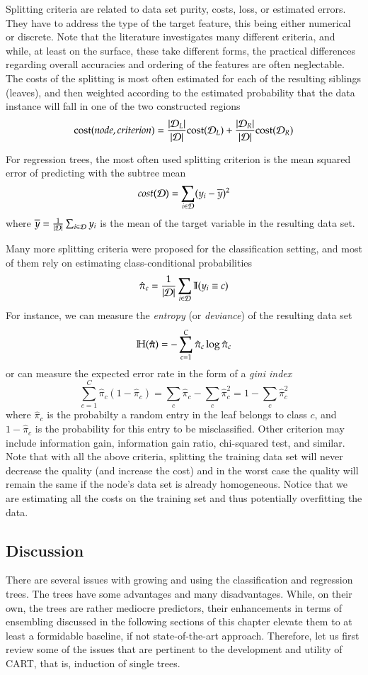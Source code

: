 \begin{refsection}
Splitting criteria are related to data set purity, costs, loss, or estimated errors. They have to address the type of the target feature, this being either numerical or discrete. Note that the literature investigates many different criteria, and while, at least on the surface, these take different forms, the practical differences regarding overall accuracies and ordering of the features are often neglectable. The costs of the splitting is most often estimated for each of the resulting siblings (leaves), and then weighted according to the estimated probability that the data instance will fall in one of the two constructed regions
$$ {\rm cost}(node, criterion) = {|\mathcal{D}_L|\over |\mathcal{D}|}{\rm cost}(\mathcal{D}_L) + {|\mathcal{D}_R|\over |\mathcal{D}|}{\rm cost}(\mathcal{D}_R) $$

For regression trees, the most often used splitting criterion is the mean squared error of predicting with the subtree mean
$$ cost(\mathcal{D}) = \sum_{i\in\mathcal{D}}(y_i-\overline{y})^2 $$
where $\overline{y} = {1\over|\mathcal{D}|}\sum_{i\in\mathcal{D}}y_i$ is the mean of the target variable in the resulting data set.

Many more splitting criteria were proposed for the classification setting, and most of them rely on estimating class-conditional probabilities
$$ \hat{\pi}_c = {1\over|\mathcal{D}|}\sum_{i\in\mathcal{D}}\mathbb{I}(y_i\equiv c) $$
For instance, we can measure the {\em entropy} (or {\em deviance}) of the resulting data set
$$ \mathbb{H}(\hat{\boldsymbol{\pi}}) = -\sum_{c=1}^C \hat{\pi}_c \log \hat{\pi}_c $$
or can measure the expected error rate in the form of a {\em gini index}
$$ \sum_{c=1}^C \hat{\pi}_c (1-\hat{\pi}_c) = \sum_c \hat{\pi}_c - \sum_c \hat{\pi}_c^2 = 1 - \sum_c \hat{\pi}_c^2 $$
where $\hat{\pi}_c$ is the probabilty a random entry in the leaf belongs to class $c$, and $1-\hat{\pi}_c$ is the probability for this entry to be misclassified. Other criterion may include information gain, information gain ratio, chi-squared test, and similar. Note that with all the above criteria, splitting the training data set will never decrease the quality (and increase the cost) and in the worst case the quality will remain the same if the node's data set is already homogeneous. Notice that we are estimating all the costs on the training set and thus potentially overfitting the data.

\subsection*{Discussion}

There are several issues with growing and using the classification and regression trees. The trees have some advantages and many disadvantages. While, on their own, the trees are rather mediocre predictors, their enhancements in terms of ensembling discussed in the following sections of this chapter elevate them to at least a formidable baseline, if not state-of-the-art approach. Therefore, let us first review some of the issues that are pertinent to the development and utility of CART, that is, induction of single trees.


\end{refsection}
